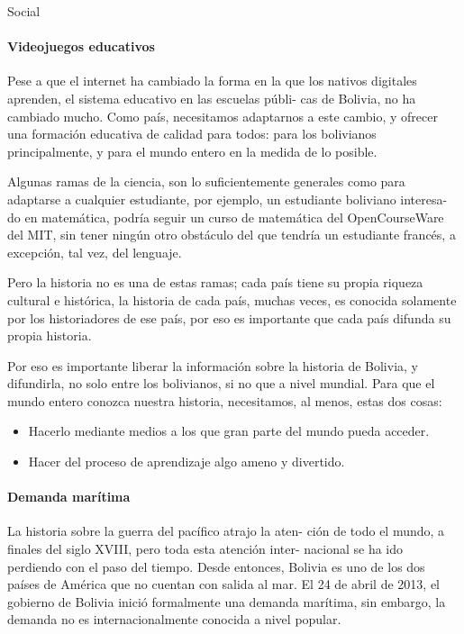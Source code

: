 \begin{subsection}{Social}
  \paragraph{Videojuegos educativos}
  Pese a que el internet ha cambiado la forma en la que los nativos digitales aprenden, el sistema educativo en las escuelas públi- cas de Bolivia, no ha cambiado mucho. Como país, necesitamos adaptarnos a este cambio, y ofrecer una formación educativa de calidad para todos: para los bolivianos principalmente, y para el mundo entero en la medida de lo posible. 

  Algunas ramas de la ciencia, son lo suficientemente generales como para adaptarse a cualquier estudiante, por ejemplo, un estudiante boliviano interesa- do en matemática, podría seguir un curso de matemática del OpenCourseWare del MIT, sin tener ningún otro obstáculo del que tendría un estudiante francés, a excepción, tal vez, del lenguaje. 

  Pero la historia no es una de estas ramas; cada país tiene su propia riqueza cultural e histórica, la historia de cada país, muchas veces, es conocida solamente por los historiadores de ese país, por eso es importante que cada país difunda su propia historia. 

  Por eso es importante liberar la información sobre la historia de Bolivia, y difundirla, no solo entre los bolivianos, si no que a nivel mundial. Para que el mundo entero conozca nuestra historia, necesitamos, al menos, estas dos cosas:

  \begin{itemize}
  \item Hacerlo mediante medios a los que gran parte del mundo pueda acceder. 
  \item Hacer del proceso de aprendizaje algo ameno y divertido.    
  \end{itemize}

  \paragraph{Demanda marítima}
  La historia sobre la guerra del pacífico atrajo la aten- ción de todo el mundo, a finales del siglo XVIII, pero toda esta atención inter- nacional se ha ido perdiendo con el paso del tiempo. Desde entonces, Bolivia es uno de los dos países de América que no cuentan con salida al mar. El 24 de abril de 2013, el gobierno de Bolivia inició formalmente una demanda marítima, sin embargo, la demanda no es internacionalmente conocida a nivel popular.
\end{subsection}
